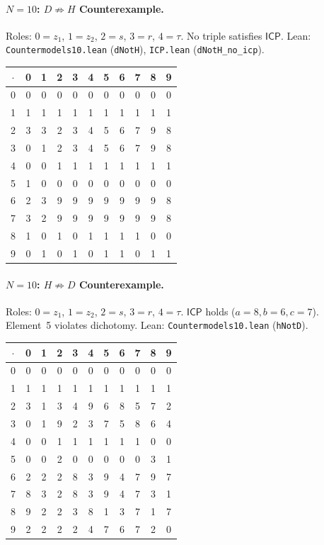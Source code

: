 \documentclass[a4paper,UKenglish,cleveref,autoref,thm-restate]{lipics-v2021}
\newcommand{\dotop}{\cdot}
\newcommand{\ICP}{\textsf{ICP}}
\begin{document}
\paragraph{$N\!=\!10$: $D \not\Rightarrow H$ Counterexample.}
Roles: $0 = z_1$, $1 = z_2$, $2 = s$, $3 = r$, $4 = \tau$. No triple satisfies $\ICP$. \quad Lean: \texttt{Countermodels10.lean} (\texttt{dNotH}), \texttt{ICP.lean} (\texttt{dNotH\_no\_icp}).

\medskip
{\footnotesize
\begin{tabular}{c|cccccccccc}
$\dotop$ & 0 & 1 & 2 & 3 & 4 & 5 & 6 & 7 & 8 & 9 \\\hline
0 & 0 & 0 & 0 & 0 & 0 & 0 & 0 & 0 & 0 & 0 \\
1 & 1 & 1 & 1 & 1 & 1 & 1 & 1 & 1 & 1 & 1 \\
2 & 3 & 3 & 2 & 3 & 4 & 5 & 6 & 7 & 9 & 8 \\
3 & 0 & 1 & 2 & 3 & 4 & 5 & 6 & 7 & 9 & 8 \\
4 & 0 & 0 & 1 & 1 & 1 & 1 & 1 & 1 & 1 & 1 \\
5 & 1 & 0 & 0 & 0 & 0 & 0 & 0 & 0 & 0 & 0 \\
6 & 2 & 3 & 9 & 9 & 9 & 9 & 9 & 9 & 9 & 8 \\
7 & 3 & 2 & 9 & 9 & 9 & 9 & 9 & 9 & 9 & 8 \\
8 & 1 & 0 & 1 & 0 & 1 & 1 & 1 & 1 & 0 & 0 \\
9 & 0 & 1 & 0 & 1 & 0 & 1 & 1 & 0 & 1 & 1 \\
\end{tabular}}

\paragraph{$N\!=\!10$: $H \not\Rightarrow D$ Counterexample.}
Roles: $0 = z_1$, $1 = z_2$, $2 = s$, $3 = r$, $4 = \tau$. $\ICP$ holds ($a\!=\!8, b\!=\!6, c\!=\!7$). Element~5 violates dichotomy. \quad Lean: \texttt{Countermodels10.lean} (\texttt{hNotD}).

\medskip
{\footnotesize
\begin{tabular}{c|cccccccccc}
$\dotop$ & 0 & 1 & 2 & 3 & 4 & 5 & 6 & 7 & 8 & 9 \\\hline
0 & 0 & 0 & 0 & 0 & 0 & 0 & 0 & 0 & 0 & 0 \\
1 & 1 & 1 & 1 & 1 & 1 & 1 & 1 & 1 & 1 & 1 \\
2 & 3 & 1 & 3 & 4 & 9 & 6 & 8 & 5 & 7 & 2 \\
3 & 0 & 1 & 9 & 2 & 3 & 7 & 5 & 8 & 6 & 4 \\
4 & 0 & 0 & 1 & 1 & 1 & 1 & 1 & 1 & 0 & 0 \\
5 & 0 & 0 & 2 & 0 & 0 & 0 & 0 & 0 & 3 & 1 \\
6 & 2 & 2 & 2 & 8 & 3 & 9 & 4 & 7 & 9 & 7 \\
7 & 8 & 3 & 2 & 8 & 3 & 9 & 4 & 7 & 3 & 1 \\
8 & 9 & 2 & 2 & 3 & 8 & 1 & 3 & 7 & 1 & 7 \\
9 & 2 & 2 & 2 & 2 & 4 & 7 & 6 & 7 & 2 & 0 \\
\end{tabular}}
\end{document}
